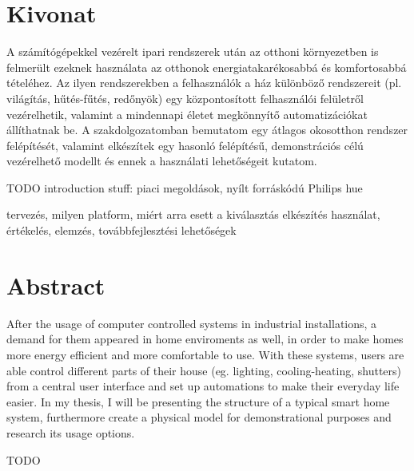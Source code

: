 \setcounter{page}{1}

\selecthungarian

\chapter*{Kivonat}

A számítógépekkel vezérelt ipari rendszerek után az otthoni környezetben is felmerült ezeknek használata az otthonok energiatakarékosabbá és komfortosabbá tételéhez. Az ilyen rendszerekben a felhasználók a ház különböző rendszereit (pl. világítás, hűtés-fűtés, redőnyök) egy központosított felhasználói felületről vezérelhetik, valamint a mindennapi életet megkönnyítő automatizációkat állíthatnak be. A szakdolgozatomban bemutatom egy átlagos okosotthon rendszer felépítését, valamint elkészítek egy hasonló felépítésű, demonstrációs célú vezérelhető modellt és ennek a használati lehetőségeit kutatom.

TODO
introduction stuff: piaci megoldások, nyílt forráskódú
Philips hue

tervezés, milyen platform, miért arra esett a kiválasztás
elkészítés
használat, értékelés, elemzés, továbbfejlesztési lehetőségek


\vfill
\selectenglish


\chapter*{Abstract}

After the usage of computer controlled systems in industrial installations, a demand for them appeared in home enviroments as well, in order to make homes more energy efficient and more comfortable to use. With these systems, users are able control different parts of their house (eg. lighting, cooling-heating, shutters) from a central user interface and set up automations to make their everyday life easier. In my thesis, I will be presenting the structure of a typical smart home system, furthermore create a physical model for demonstrational purposes and research its usage options.

TODO

\vfill
\selectthesislanguage

\setcounter{romanPage}{\value{page}}
